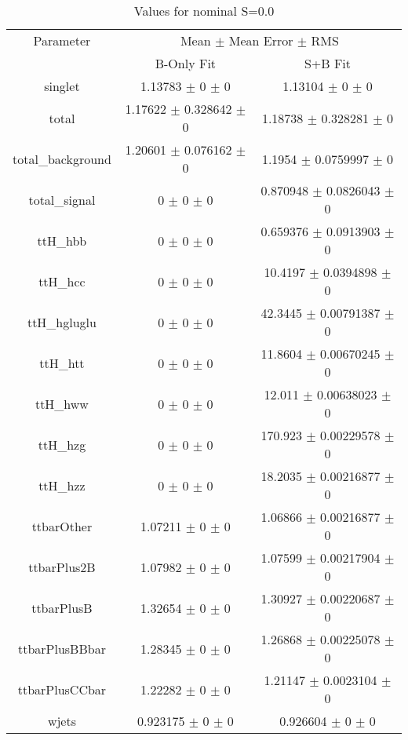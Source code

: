 \begin{table}
\centering
\caption{Values for nominal S=0.0}
\begin{tabular}{ccc}
\toprule
Parameter & \multicolumn{2}{c}{Mean $\pm$ Mean Error $\pm$ RMS}\\
 & B-Only Fit & S+B Fit\\
\midrule
singlet & \num{1.13783} $\pm$ \num{0} $\pm$ \num{0} & \num{1.13104} $\pm$ \num{0} $\pm$ \num{0}\\
total & \num{1.17622} $\pm$ \num{0.328642} $\pm$ \num{0} & \num{1.18738} $\pm$ \num{0.328281} $\pm$ \num{0}\\
total\_background & \num{1.20601} $\pm$ \num{0.076162} $\pm$ \num{0} & \num{1.1954} $\pm$ \num{0.0759997} $\pm$ \num{0}\\
total\_signal & \num{0} $\pm$ \num{0} $\pm$ \num{0} & \num{0.870948} $\pm$ \num{0.0826043} $\pm$ \num{0}\\
ttH\_hbb & \num{0} $\pm$ \num{0} $\pm$ \num{0} & \num{0.659376} $\pm$ \num{0.0913903} $\pm$ \num{0}\\
ttH\_hcc & \num{0} $\pm$ \num{0} $\pm$ \num{0} & \num{10.4197} $\pm$ \num{0.0394898} $\pm$ \num{0}\\
ttH\_hgluglu & \num{0} $\pm$ \num{0} $\pm$ \num{0} & \num{42.3445} $\pm$ \num{0.00791387} $\pm$ \num{0}\\
ttH\_htt & \num{0} $\pm$ \num{0} $\pm$ \num{0} & \num{11.8604} $\pm$ \num{0.00670245} $\pm$ \num{0}\\
ttH\_hww & \num{0} $\pm$ \num{0} $\pm$ \num{0} & \num{12.011} $\pm$ \num{0.00638023} $\pm$ \num{0}\\
ttH\_hzg & \num{0} $\pm$ \num{0} $\pm$ \num{0} & \num{170.923} $\pm$ \num{0.00229578} $\pm$ \num{0}\\
ttH\_hzz & \num{0} $\pm$ \num{0} $\pm$ \num{0} & \num{18.2035} $\pm$ \num{0.00216877} $\pm$ \num{0}\\
ttbarOther & \num{1.07211} $\pm$ \num{0} $\pm$ \num{0} & \num{1.06866} $\pm$ \num{0.00216877} $\pm$ \num{0}\\
ttbarPlus2B & \num{1.07982} $\pm$ \num{0} $\pm$ \num{0} & \num{1.07599} $\pm$ \num{0.00217904} $\pm$ \num{0}\\
ttbarPlusB & \num{1.32654} $\pm$ \num{0} $\pm$ \num{0} & \num{1.30927} $\pm$ \num{0.00220687} $\pm$ \num{0}\\
ttbarPlusBBbar & \num{1.28345} $\pm$ \num{0} $\pm$ \num{0} & \num{1.26868} $\pm$ \num{0.00225078} $\pm$ \num{0}\\
ttbarPlusCCbar & \num{1.22282} $\pm$ \num{0} $\pm$ \num{0} & \num{1.21147} $\pm$ \num{0.0023104} $\pm$ \num{0}\\
wjets & \num{0.923175} $\pm$ \num{0} $\pm$ \num{0} & \num{0.926604} $\pm$ \num{0} $\pm$ \num{0}\\
\bottomrule
\end{tabular}
\end{table}